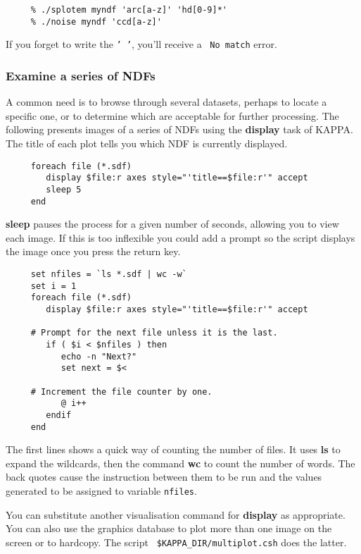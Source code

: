 \documentclass[twoside,11pt]{article}
\newcommand{\htmlref}[2]{#1}
\newcommand{\xref}[3]{#1}
\newcommand{\xlabel}[1]{}
\newcommand{\KAPPAref}{\xref{{\footnotesize KAPPA}}{sun95}{}}
\newcommand{\NDFref}[1]{\xref{#1}{sun33}{}}
\begin{document}
\small
\begin{verbatim}
     % ./splotem myndf 'arc[a-z]' 'hd[0-9]*'
     % ./noise myndf 'ccd[a-z]'
\end{verbatim}
\normalsize
If you forget to write the {\tt '~'}, you'll receive a ~{\tt No match}
error.

\subsubsection{\xlabel{sc4_se_display_series}Examine a series of NDFs
\label{sc4_se_display_series}}

A common need is to browse through several datasets, perhaps to locate
a specific one, or to determine which are acceptable for further
processing.  The following presents images of a series of \NDFref{{\sf
NDF}s} using the \xref{{\bf display}}{sun95}{DISPLAY} task of
\KAPPAref\@.  The title of each plot tells you which NDF is currently
displayed.

\small
\begin{verbatim}
     foreach file (*.sdf)
        display $file:r axes style="'title==$file:r'" accept
        sleep 5
     end
\end{verbatim}
\normalsize
{\bf sleep} pauses the \htmlref{{\sf process}}{sc4_gl_pro} for a given
number of seconds, allowing you to view each image.  If this is too
inflexible you could add a prompt so the script displays the image
once you press the return key.

\small
\begin{verbatim}
     set nfiles = `ls *.sdf | wc -w`
     set i = 1
     foreach file (*.sdf)
        display $file:r axes style="'title==$file:r'" accept

     # Prompt for the next file unless it is the last.
        if ( $i < $nfiles ) then
           echo -n "Next?"
           set next = $<

     # Increment the file counter by one.
           @ i++
        endif
     end
\end{verbatim}
\normalsize
The first lines shows a quick way of counting the number of files. It
uses {\bf ls} to expand the \htmlref{{\sf wildcards}}{sc4_gl_wild}, then
the command {\bf wc} to count the number of words.  The back quotes
cause the instruction between them to be run and the values generated
to be assigned to variable {\tt nfiles}.

You can substitute another visualisation command for {\bf display}
as appropriate.  You can also use the graphics database to plot more
than one image on the screen or to hardcopy.  The script {\tt
\$KAPPA\_DIR/multiplot.csh} does the latter.
\end{document}
